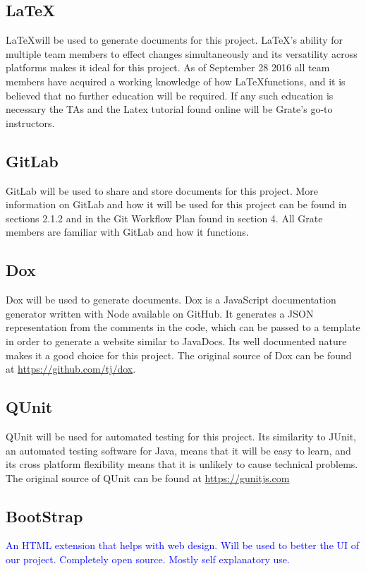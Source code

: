 \documentclass{article}
\begin{document}
\subsection{\LaTeX}

\LaTeX will be used to generate documents for this project. \LaTeX's ability for 
multiple team members to effect changes simultaneously and its versatility 
across platforms makes it ideal for this project. As of September 28 2016 all 
team members have acquired a working knowledge of how \LaTeX functions, and it 
is 
believed that no further education will be required. If any such education is 
necessary the TAs and the Latex tutorial found online will be Grate's go-to 
instructors. 

\subsection{GitLab}

GitLab will be used to share and store documents for this project. More 
information on GitLab and how it will be used for this project can be found in 
sections 2.1.2 and in the Git Workflow Plan found in section 4. All Grate 
members are familiar with GitLab and how it functions. 

\subsection{Dox}
Dox will be used to generate documents. Dox is a JavaScript documentation 
generator written with Node available on GitHub. It generates a JSON 
representation from the comments in the code, which can be passed to a template 
in order to generate a website similar to JavaDocs. Its well documented nature 
makes it a good choice for this project. The original source of Dox can be found 
at
\href{https://github.com/tj/dox}{https://github.com/tj/dox}.

\subsection{QUnit}
QUnit will be used for automated testing for this project. Its similarity to 
JUnit, an automated testing software for Java, means that it will be easy to 
learn, and its cross platform flexibility means that it is unlikely to cause 
technical problems. The original source of QUnit can be found at
\href{https://qunitjs.com/}{https://gunitjs.com}

\subsection{BootStrap}
\textcolor{blue}{
An HTML extension that helps with web design. Will be used to better the UI of 
our project. Completely open source. Mostly self explanatory use.}
\end{document}
